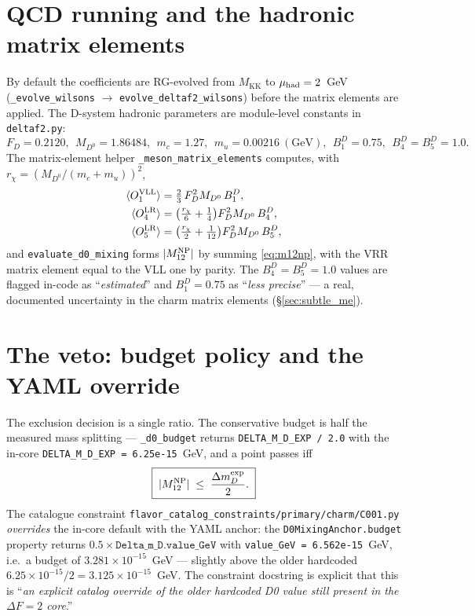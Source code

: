 \documentclass[11pt]{article}
\newcommand{\MKK}{M_{\mathrm{KK}}}
\newcommand{\code}[1]{\texttt{#1}}
\newcommand{\Mtwelve}{M_{12}}
\newcommand{\dmD}{\Delta m_D}
\theoremstyle{definition}
\begin{document}
\section{QCD running and the hadronic matrix elements}
\label{sec:running}

By default the coefficients are RG-evolved from $\MKK$ to $\mu_{\rm had}=2$~GeV
(\code{\_evolve\_wilsons} $\to$ \code{evolve\_deltaf2\_wilsons}) before the
matrix elements are applied. The D-system hadronic parameters are module-level
constants in \code{deltaf2.py}:
\begin{equation}
F_D = 0.2120,\ \ M_{D^0}=1.86484,\ \ m_c=1.27,\ \ m_u=0.00216\ \mathrm{(GeV)},\ \
B_1^D=0.75,\ \ B_4^D=B_5^D=1.0.
\end{equation}
The matrix-element helper \code{\_meson\_matrix\_elements} computes, with
$r_\chi=(M_{D^0}/(m_c+m_u))^2$,
\begin{align}
\langle O_1^{\rm VLL}\rangle &= \tfrac{2}{3}\,F_D^2 M_{D^0}\,B_1^D, \nonumber\\
\langle O_4^{\rm LR}\rangle &= \big(\tfrac{r_\chi}{6}+\tfrac14\big)F_D^2 M_{D^0}\,B_4^D, \nonumber\\
\langle O_5^{\rm LR}\rangle &= \big(\tfrac{r_\chi}{2}+\tfrac{1}{12}\big)F_D^2 M_{D^0}\,B_5^D,
\label{eq:codeME}
\end{align}
and \code{evaluate\_d0\_mixing} forms $|\Mtwelve^{\rm NP}|$ by summing
\eqref{eq:m12np}, with the VRR matrix element equal to the VLL one by parity. The
$B_4^D=B_5^D=1.0$ values are flagged in-code as ``\emph{estimated}'' and
$B_1^D=0.75$ as ``\emph{less precise}'' --- a real, documented uncertainty in
the charm matrix elements (\S\ref{sec:subtle_me}).

\section{The veto: budget policy and the YAML override}
\label{sec:veto}

The exclusion decision is a single ratio. The conservative budget is half the
measured mass splitting --- \code{\_d0\_budget} returns
\code{DELTA\_M\_D\_EXP / 2.0} with the in-core
\code{DELTA\_M\_D\_EXP = 6.25e-15}~GeV, and a point passes iff
\begin{equation}
\boxed{\;|\Mtwelve^{\rm NP}| \;\le\; \frac{\dmD^{\rm exp}}{2}.\;}
\label{eq:veto}
\end{equation}
The catalogue constraint \code{flavor\_catalog\_constraints/primary/charm/C001.py}
\emph{overrides} the in-core default with the YAML anchor: the
\code{D0MixingAnchor.budget} property returns
$0.5\times\code{Delta\_m\_D.value\_GeV}$ with
\code{value\_GeV = 6.562e-15}~GeV, i.e.\ a budget of
$3.281\times10^{-15}$~GeV --- slightly above the older hardcoded
$6.25\times10^{-15}/2 = 3.125\times10^{-15}$~GeV. The constraint docstring is
explicit that this is ``\emph{an explicit catalog override of the older hardcoded
D0 value still present in the $\Delta F=2$ core}.''
\end{document}
